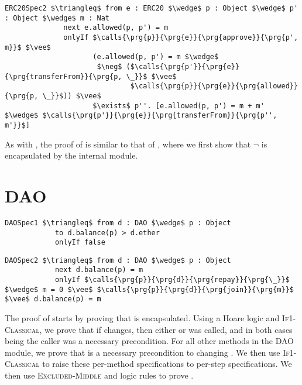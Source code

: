 \documentclass[acmsmall,review,anonymous]{acmart}\settopmatter{printfolios=true,printccs=false,printacmref=false}
\begin{document}
\begin{lstlisting}[language = Chainmail, mathescape=true, frame=lines]
ERC20Spec2 $\triangleq$ from e : ERC20 $\wedge$ p : Object $\wedge$ p' : Object $\wedge$ m : Nat
              next e.allowed(p, p') = m
              onlyIf $\calls{\prg{p}}{\prg{e}}{\prg{approve}}{\prg{p', m}}$ $\vee$ 
                     (e.allowed(p, p') = m $\wedge$ 
                      $\neg$ ($\calls{\prg{p'}}{\prg{e}}{\prg{transferFrom}}{\prg{p, \_}}$ $\vee$ 
                              $\calls{\prg{p}}{\prg{e}}{\prg{allowed}}{\prg{p, \_}}$)) $\vee$
                     $\exists$ p''. [e.allowed(p, p') = m + m' $\wedge$ $\calls{\prg{p'}}{\prg{e}}{\prg{transferFrom}}{\prg{p'', m'}}$]
\end{lstlisting}
As with , the proof of  is similar to that of , 
where we first show that $\neg$  is encapsulated by the internal  module.

\section{DAO}

\begin{lstlisting}[language = Chainmail, mathescape=true, frame=lines]
DAOSpec1 $\triangleq$ from d : DAO $\wedge$ p : Object
            to d.balance(p) > d.ether
            onlyIf false
\end{lstlisting}
	
\begin{lstlisting}[language = Chainmail, mathescape=true, frame=lines]
DAOSpec2 $\triangleq$ from d : DAO $\wedge$ p : Object
            next d.balance(p) = m
            onlyIf $\calls{\prg{p}}{\prg{d}}{\prg{repay}}{\prg{\_}}$ $\wedge$ m = 0 $\vee$ $\calls{\prg{p}}{\prg{d}}{\prg{join}}{\prg{m}}$ $\vee$ d.balance(p) = m
\end{lstlisting}
The proof of  starts by proving that  is encapsulated.
Using a Hoare logic and \textsc{If1-Classical}, we prove that if  changes,
then either  or  was called, and in both cases 
 being the caller was a necessary precondition. For all other methods in the DAO module, we prove that  is a necessary precondition to changing .
We then use \textsc{If1-Classical} to raise these per-method \Nec specifications to per-step specifications. We then use \textsc{Excluded-Middle} and \Nec logic rules to prove 
.
\end{document}
